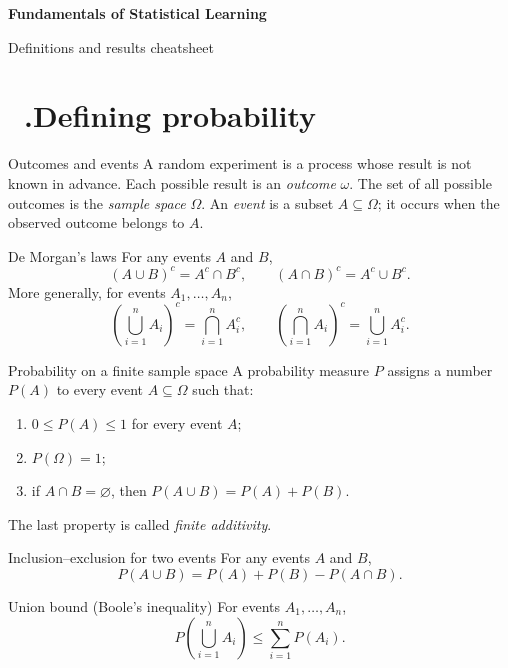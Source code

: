 \documentclass[12pt,a4paper,oneside]{report}
\newcommand{\notesheading}[1]{%
  \refstepcounter{chapter}%
  \section*{\chaptername~\thechapter.\enspace #1}}
\begin{document}
\thispagestyle{notescontents}
\begin{center}
  {\Large\bfseries Fundamentals of Statistical Learning}\par
  \smallskip
  {\large Definitions and results cheatsheet}
\end{center}

\notesheading{Defining probability}

\begin{frameddefn}{Outcomes and events}\label{def:outcomes-events}
A random experiment is a process whose result is not known in advance.
Each possible result is an \emph{outcome} $\omega$. The set of all possible
outcomes is the \emph{sample space} $\Omega$. An \emph{event} is a subset
$A\subseteq\Omega$; it occurs when the observed outcome belongs to $A$.
\end{frameddefn}

\begin{framedprop}{De Morgan's laws}\label{prop:de-morgan}
For any events $A$ and $B$,
\[
  (A\cup B)^c=A^c\cap B^c,
  \qquad
  (A\cap B)^c=A^c\cup B^c.
\]
More generally, for events $A_1,\ldots,A_n$,
\[
  \left(\bigcup_{i=1}^{n}A_i\right)^c
    =\bigcap_{i=1}^{n}A_i^c,
  \qquad
  \left(\bigcap_{i=1}^{n}A_i\right)^c
    =\bigcup_{i=1}^{n}A_i^c.
\]
\end{framedprop}

\begin{frameddefn}{Probability on a finite sample space}\label{def:probability-finite}
A probability measure $P$ assigns a number $P(A)$ to every event
$A\subseteq\Omega$ such that:
\begin{enumerate}
  \item $0\leq P(A)\leq 1$ for every event $A$;
  \item $P(\Omega)=1$;
  \item if $A\cap B=\varnothing$, then
        $P(A\cup B)=P(A)+P(B)$.
\end{enumerate}
The last property is called \emph{finite additivity}.
\end{frameddefn}

\begin{framedprop}{Inclusion--exclusion for two events}
For any events $A$ and $B$,
\[
  P(A\cup B)=P(A)+P(B)-P(A\cap B).
\]
\end{framedprop}

\begin{framedprop}{Union bound (Boole's inequality)}
For events $A_1,\ldots,A_n$,
\[
  P\!\left(\bigcup_{i=1}^{n} A_i\right)
  \leq \sum_{i=1}^{n}P(A_i).
\]
\end{framedprop}
\end{document}
